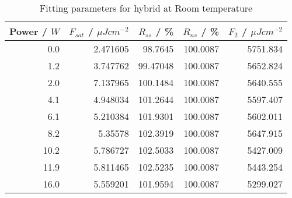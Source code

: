 \begin{table}[H]
\caption{Fitting parameters for hybrid at Room temperature}
\begin{tabular}{rrrrr}
\toprule
Power / $W$ & $F_{sat}$ / $\mu Jcm^{-2}$ & $R_{ss}$ / \% & $R_{ns}$ / \% & $F_2$ / $\mu Jcm^{-2}$ \\
\midrule
0.0 & 2.471605 & 98.7645 & 100.0087 & 5751.834 \\
1.2 & 3.747762 & 99.47048 & 100.0087 & 5652.824 \\
2.0 & 7.137965 & 100.1484 & 100.0087 & 5640.555 \\
4.1 & 4.948034 & 101.2644 & 100.0087 & 5597.407 \\
6.1 & 5.210384 & 101.9301 & 100.0087 & 5602.011 \\
8.2 & 5.35578 & 102.3919 & 100.0087 & 5647.915 \\
10.2 & 5.786727 & 102.5033 & 100.0087 & 5427.009 \\
11.9 & 5.811465 & 102.5235 & 100.0087 & 5443.254 \\
16.0 & 5.559201 & 101.9594 & 100.0087 & 5299.027 \\
\bottomrule
\end{tabular}
\end{table}
